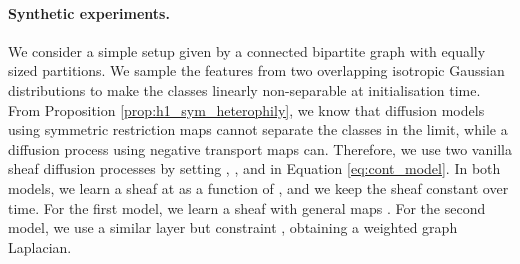 \documentclass{article}
\begin{document}
\paragraph{Synthetic experiments.} We consider a simple setup given by a connected bipartite graph with equally sized partitions. We sample the features from two overlapping isotropic Gaussian distributions to make the classes linearly non-separable at initialisation time. From Proposition \ref{prop:h1_sym_heterophily}, we know that diffusion models using symmetric restriction maps cannot separate the classes in the limit, while a diffusion process using negative transport maps can. Therefore, we use two vanilla sheaf diffusion processes by setting , ,  and  in Equation \ref{eq:cont_model}. In both models, we learn a sheaf at  as a function of , and we keep the sheaf constant over time. For the first model, we learn a sheaf with general maps . For the second model, we use a similar layer but constraint , obtaining a weighted graph Laplacian.   
\end{document}
